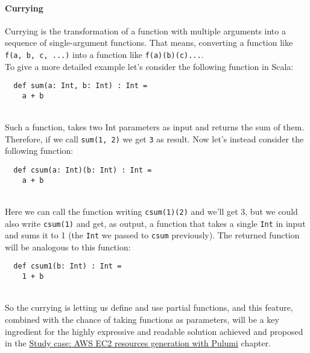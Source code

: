 \paragraph{Currying}
Currying is the transformation of a function with multiple arguments into a sequence of single-argument functions. That means, converting a function like \texttt{f(a, b, c, ...)} into a function like \texttt{f(a)(b)(c)...}.\\
To give a more detailed example let's consider the following function in Scala:
\begin{verbatim}
  def sum(a: Int, b: Int) : Int = 
    a + b
\end{verbatim}\mbox{}\\
Such a function, takes two Int parameters as input and returns the sum of them.
Therefore, if we call \texttt{sum(1, 2)} we get \texttt{3} as result.
Now let's instead consider the following function:
\begin{verbatim}
  def csum(a: Int)(b: Int) : Int = 
    a + b
\end{verbatim}\mbox{}\\
Here we can call the function writing \texttt{csum(1)(2)} and we'll get 3, but we could also write \texttt{csum(1)} and get, as output, a function that takes a single \texttt{Int} in input and sums it to 1 (the \texttt{Int} we passed to \texttt{csum} previously).
The returned function will be analogous to this function:
\begin{verbatim}
  def csum1(b: Int) : Int = 
    1 + b
\end{verbatim}\mbox{}\\
So the currying is letting us define and use partial functions, and this feature, combined with the chance of taking functions as parameters, will be a key ingredient for the highly expressive and readable solution achieved and proposed in the \hyperref[cap:case-study]{Study case: AWS EC2 resources generation with Pulumi} chapter.


